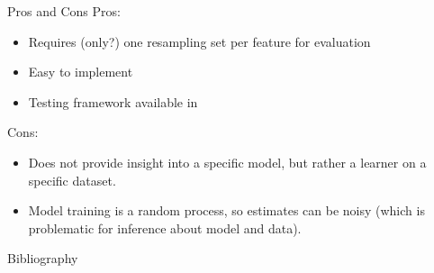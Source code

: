 \documentclass[11pt,compress,t,notes=noshow, aspectratio=169, xcolor=table]{beamer}
\begin{document}
\begin{vbframe}{Pros and Cons}
  Pros:
  \begin{itemize}
    \item Requires (only?) one resampling set per feature for evaluation
    \item Easy to implement
    \item Testing framework available in \cite{lei_distribution-free_2018}
  \end{itemize}
%
  Cons:
  \begin{itemize}
    \item Does not provide insight into a specific model, but rather a learner on a specific dataset.
    \item Model training is a random process, so estimates can be noisy (which is problematic for inference about model and data).
  \end{itemize}
\end{vbframe}

\begin{vbframe}{Bibliography}
  \printbibliography
\end{vbframe}

\endlecture
\end{document}
